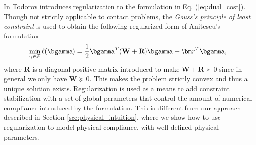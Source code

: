 In \cite{bib:todorov2011, bib:todorov2014} Todorov introduces regularization to
the formulation in Eq. (\ref{eq:dual_cost}). Though not strictly applicable to
contact problems, the \emph{Gauss's principle of least constraint} is used to
obtain the following regularized form of Anitescu's formulation
\begin{eqnarray}
	\min_{\gamma\in \mathcal{F}} \ell(\bgamma) =
	\frac{1}{2}\bgamma^T(\mathbf{W}+\mathbf{R})\bgamma + {\bm r}^T \bgamma,
	\label{eq:dual_regularized}
\end{eqnarray}
where $\mathbf{R}$ is a diagonal positive matrix introduced to make
$\mathbf{W}+\mathbf{R}\succ 0$ since in general we only have $\mathbf{W} \succeq
0$. This makes the problem strictly convex and thus a unique solution exists.
Regularization is used as a means to add constraint stabilization with a set of
global parameters that control the amount of numerical compliance introduced by
the formulation. This is different from our approach described in Section
\ref{sec:physical_intuition}, where we show how to use regularization to model
physical compliance, with well defined physical parameters.
